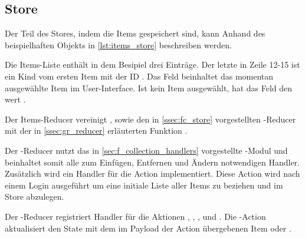 \subsection{Store}
\label{ssec:fi_store}

Der Teil des Stores, indem die Items gespeichert sind, kann Anhand des
beispielhaften Objekts in \cref{lst:items_store} beschreiben werden.



Die Items-Liste enthält in dem Besipiel drei Einträge.  Der letzte in Zeile
12-15 ist ein Kind vom ersten Item mit der ID .  Das Feld
 beinhaltet das momentan ausgewählte Item im User-Interface.
Ist kein Item ausgewählt, hat das Feld den wert .

Der Items-Reducer vereinigt ,
 sowie den in \cref{ssec:fc_store} vorgestellten
-Reducer mit der in \cref{ssec:gr_reducer} erläuterten
Funktion .

Der -Reducer nutzt das in \cref{sec:f_collection_handlers}
vorgestellte -Modul und beinhaltet somit alle zum
Einfügen, Entfernen und Ändern notwendigen Handler.  Zusätzlich wird ein
Handler für die Action  implementiert.  Diese
Action wird nach einem Login ausgeführt um eine initiale Liste aller Items
zu beziehen und im Store abzulegen.

Der -Reducer registriert Handler für die Aktionen
, ,
, und .  Die
-Action aktualisiert den State mit dem im Payload
der Action übergebenen Item oder .
